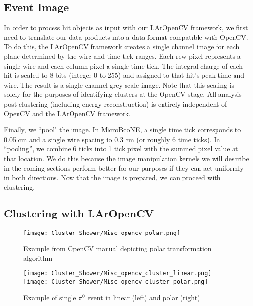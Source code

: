 \subsection{Event Image}
\par In order to process hit objects as input with our LArOpenCV framework, we first need to translate our data products into a data format compatible with OpenCV. To do this, the LArOpenCV framework creates a single channel image for each plane determined by the wire and time tick ranges. Each row pixel represents a single wire and each column pixel a single time tick. The integral charge of each hit is scaled to 8 bits (integer 0 to 255) and assigned to that hit's peak time and wire. The result is a single channel grey-scale image. Note that this scaling is solely for the purposes of identifying clusters at the OpenCV stage. All analysis post-clustering (including energy reconstruction) is entirely independent of OpenCV and the LArOpenCV framework. 
\par Finally, we ``pool" the image. In MicroBooNE, a single time tick corresponds to 0.05 cm and a single wire spacing to 0.3 cm (or roughly 6 time ticks).  In ``pooling'', we combine 6 ticks into 1 tick pixel with the summed pixel value at that location. We do this because the image manipulation kernels we will describe in the coming sections perform better for our purposes if they can act uniformly in both directions. Now that the image is prepared, we can proceed with clustering.
\subsection{Clustering with LArOpenCV }

\begin{figure}[h!]
\centering
\texttt{[image: Cluster\_Shower/Misc\_opencv\_polar.png]}
\caption{ Example from OpenCV manual depicting polar transformation algorithm \cite{bib:linearPolar}}
\label{fig:polar}
\end{figure}

\begin{figure}[h!]
\centering
\texttt{[image: Cluster\_Shower/Misc\_opencv\_cluster\_linear.png]}
\texttt{[image: Cluster\_Shower/Misc\_opencv\_cluster\_polar.png]}

\caption{ Example of single $\pi^0$ event in linear (left) and polar (right)}
\label{fig:pi0_polar}
\end{figure}

